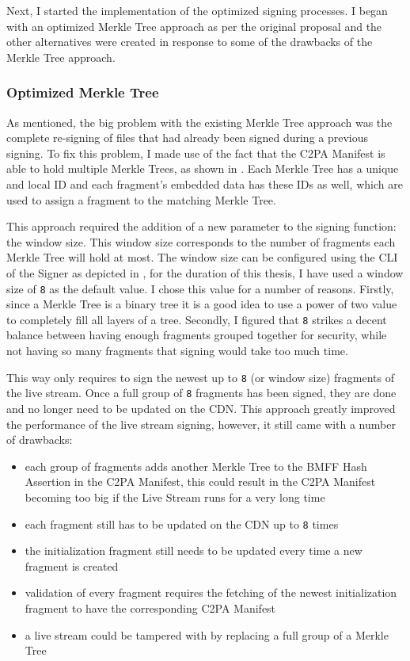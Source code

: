 Next, I started the implementation of the optimized signing processes. I began with an optimized Merkle Tree approach as per the original proposal and the other alternatives were created in response to some of the drawbacks of the Merkle Tree approach.

\subsubsection{Optimized Merkle Tree}

As mentioned, the big problem with the existing Merkle Tree approach was the complete re-signing of files that had already been signed during a previous signing. To fix this problem, I made use of the fact that the C2PA Manifest is able to hold multiple Merkle Trees, as shown in . Each Merkle Tree has a unique and local ID and each fragment's embedded data has these IDs as well, which are used to assign a fragment to the matching Merkle Tree.

This approach required the addition of a new parameter to the signing function: the window size. This window size corresponds to the number of fragments each Merkle Tree will hold at most. The window size can be configured using the CLI of the Signer as depicted in , for the duration of this thesis, I have used a window size of \texttt{8} as the default value. I chose this value for a number of reasons. Firstly, since a Merkle Tree is a binary tree it is a good idea to use a power of two value to completely fill all layers of a tree. Secondly, I figured that \texttt{8} strikes a decent balance between having enough fragments grouped together for security, while not having so many fragments that signing would take too much time.

This way only requires to sign the newest up to \texttt{8} (or window size) fragments of the live stream. Once a full group of \texttt{8} fragments has been signed, they are done and no longer need to be updated on the CDN. This approach greatly improved the performance of the live stream signing, however, it still came with a number of drawbacks:

\begin{itemize}
    \item each group of fragments adds another Merkle Tree to the BMFF Hash Assertion in the C2PA Manifest, this could result in the C2PA Manifest becoming too big if the Live Stream runs for a very long time
    \item each fragment still has to be updated on the CDN up to \texttt{8} times
    \item the initialization fragment still needs to be updated every time a new fragment is created
    \item validation of every fragment requires the fetching of the newest initialization fragment to have the corresponding C2PA Manifest
    \item a live stream could be tampered with by replacing a full group of a Merkle Tree
\end{itemize}

